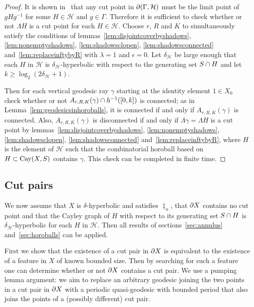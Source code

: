 \begin{proof} It is shown in~\cite[Theorem 0.2]{bowditch99a} that any cut point in
$\partial(\Gamma, \mathcal{H})$ must be the limit point of $gHg^{-1}$ for some
$H \in \mathcal{H}$ and $g \in \Gamma$. Therefore it is sufficient to check
whether or not $\Lambda H$ is a cut point for each $H \in \mathcal{H}$.  Choose
$r$, $R$ and $K$ to simultaneously satisfy the conditions of
lemmas~\ref{lem:disjointcoverbyshadows}, \ref{lem:nonemptyshadows},
\ref{lem:shadowsclopen}, \ref{lem:shadowsconnected}
and~\ref{lem:replaceinftybyR} with $\lambda = 1$ and $\epsilon = 0$. Let
$\delta_\mathcal{H}$ be large enough that each $H$ in $\mathcal{H}$ is
$\delta_\mathcal{H}$-hyperbolic with respect to the generating set $S \cap H$ and
let $k \geq \log_2(2\delta_\mathcal{H} + 1)$.

Then for each vertical geodesic ray $\gamma$ starting at the identity element
$1 \in X_0$ check whether or not $A_{r, R, K}(\gamma) \cap h^{-1}([0,
k])$ is connected; as in Lemma~\ref{lem:geodesicsinhoroballs}, it is connected
if and only if $A_{r, R, K}(\gamma)$ is connected. Also, $A_{r, R, K}(\gamma)$
is disconnected if and only if $\Lambda\gamma = \Lambda H$ is a cut point by
lemmas~\ref{lem:disjointcoverbyshadows}, \ref{lem:nonemptyshadows},
\ref{lem:shadowsclopen}, \ref{lem:shadowsconnected}
and~\ref{lem:replaceinftybyR}, where $H$ is the element of $\mathcal{H}$ such
that the combinatorial horoball based on $H \subset \operatorname{\mathrm{Cay}}(X, S)$ contains
$\gamma$. This check can be completed in finite time. \end{proof}

\subsection{Cut pairs}\label{subsec:cutpairs}

We now assume that $X$ is $\delta$-hyperbolic and satisfies $\ddag_n$, that
$\partial X$ contains no cut point and that the Cayley graph of $H$ with
respect to its generating set $S \cap H$ is $\delta_\mathcal{H}$-hyperbolic for
each $H$ in $\mathcal{H}$.  Then all results of sections~\ref{sec:annulus}
and~\ref{sec:horoballs} can be applied.

First we show that the existence of a cut pair in $\partial X$ is equivalent
to the existence of a feature in $X$ of known bounded size. Then by searching
for such a feature one can determine whether or not $\partial X$ contains a
cut pair. We use a pumping lemma argument: we aim to replace an
arbitrary geodesic joining the two points in a cut pair in $\partial X$ with a
periodic quasi-geodesic with bounded period that also joins the points of a
(possibly different) cut pair.

